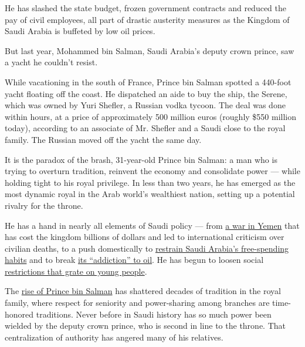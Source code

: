 He has slashed the state budget, frozen government contracts and reduced
the pay of civil employees, all part of drastic austerity measures as
the Kingdom of Saudi Arabia is buffeted by low oil prices.

But last year, Mohammed bin Salman, Saudi Arabia's deputy crown prince,
saw a yacht he couldn't resist.

While vacationing in the south of France, Prince bin Salman spotted a
440-foot yacht floating off the coast. He dispatched an aide to buy the
ship, the Serene, which was owned by Yuri Shefler, a Russian vodka
tycoon. The deal was done within hours, at a price of approximately 500
million euros (roughly \$550 million today), according to an associate
of Mr. Shefler and a Saudi close to the royal family. The Russian moved
off the yacht the same day.

It is the paradox of the brash, 31-year-old Prince bin Salman: a man who
is trying to overturn tradition, reinvent the economy and consolidate
power --- while holding tight to his royal privilege. In less than two
years, he has emerged as the most dynamic royal in the Arab world's
wealthiest nation, setting up a potential rivalry for the throne.

He has a hand in nearly all elements of Saudi policy --- from
\href{http://www.nytimes3xbfgragh.onion/2016/08/25/world/middleeast/yemen-saudi-arabia-hospital-bombing.html}{a
war in Yemen} that has cost the kingdom billions of dollars and led to
international criticism over civilian deaths, to a push domestically to
\href{http://www.nytimes3xbfgragh.onion/2015/12/29/world/middleeast/squeezed-by-low-oil-prices-saudi-arabia-cuts-spending-to-shrink-deficit.html}{restrain
Saudi Arabia's free-spending habits} and to break
\href{http://www.nytimes3xbfgragh.onion/2016/04/26/world/middleeast/saudi-prince-shares-planto-cut-oil-dependency-and-energize-the-economy.html}{its
``addiction'' to oil}. He has begun to loosen social
\href{http://www.nytimes3xbfgragh.onion/2015/05/23/world/middleeast/saudi-arabia-youths-cellphone-apps-freedom.html}{restrictions
that grate on young people}.

The
\href{http://www.nytimes3xbfgragh.onion/2015/06/07/world/middleeast/surprising-saudi-rises-as-a-prince-among-princes.html}{rise
of Prince bin Salman} has shattered decades of tradition in the royal
family, where respect for seniority and power-sharing among branches are
time-honored traditions. Never before in Saudi history has so much power
been wielded by the deputy crown prince, who is second in line to the
throne. That centralization of authority has angered many of his
relatives.

